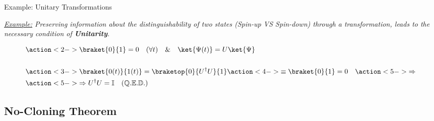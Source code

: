 \documentclass[9pt, handout, aspectratio=169]{beamer}		%
\begin{document}
	\begin{frame}{Example: Unitary Transformations}

		\textit{\underline{Example:} Preserving information about the distinguishability of two states (Spin-up VS Spin-down) through a transformation, leads to the necessary condition of \textbf{Unitarity}.}

		\begin{align*}
			&\action<2->{ \braket{0}{1} =0 \quad (\forall t) \quad \& \quad \ket{\Psi (t)} = U\ket{\Psi} } \\
			 \\
			&\action<3->{ \braket{0(t)}{1(t)} = \braketop{0}{U^\dagger U}{1} } \action<4->{ \equiv \braket{0}{1}=0 \quad } \action<5->{ \Rightarrow } \\
			&\action<5->{ \Rightarrow U^\dagger U = \mathbb{I} \quad \mathbb{(Q.E.D.)} }
		\end{align*}


	\end{frame}


	\subsection{No-Cloning Theorem}
\end{document}
